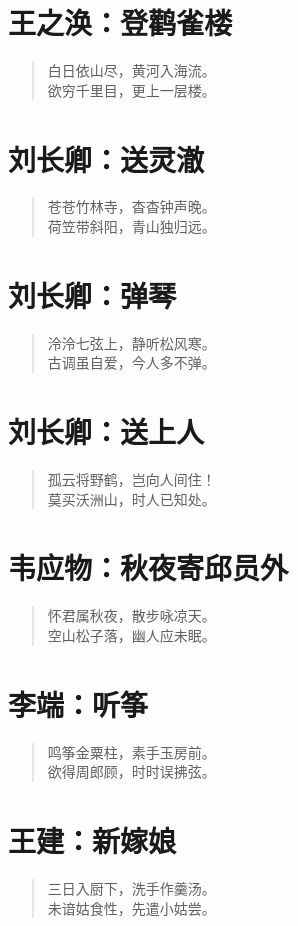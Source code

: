 \documentclass[12pt,oneside]{book}
\newenvironment{shici}{
\begin{verse}
\centering\large\hspace{12pt}}
{\end{verse}}
\begin{document}
\chapter{王之涣：登鹳雀楼}
\begin{shici}
白日依山尽，黄河入海流。\\
欲穷千里目，更上一层楼。
\end{shici}

\chapter{刘长卿：送灵澈}
\begin{shici}
苍苍竹林寺，杳杳钟声晚。\\
荷笠带斜阳，青山独归远。
\end{shici}

\chapter{刘长卿：弹琴}
\begin{shici}
泠泠七弦上，静听松风寒。\\
古调虽自爱，今人多不弹。
\end{shici}

\chapter{刘长卿：送上人}
\begin{shici}
孤云将野鹤，岂向人间住！\\
莫买沃洲山，时人已知处。
\end{shici}

\chapter{韦应物：秋夜寄邱员外}
\begin{shici}
怀君属秋夜，散步咏凉天。\\
空山松子落，幽人应未眠。
\end{shici}

\chapter{李端：听筝}
\begin{shici}
鸣筝金粟柱，素手玉房前。\\
欲得周郎顾，时时误拂弦。
\end{shici}

\chapter{王建：新嫁娘}
\begin{shici}
三日入厨下，洗手作羹汤。\\
未谙姑食性，先遣小姑尝。
\end{shici}
\end{document}
